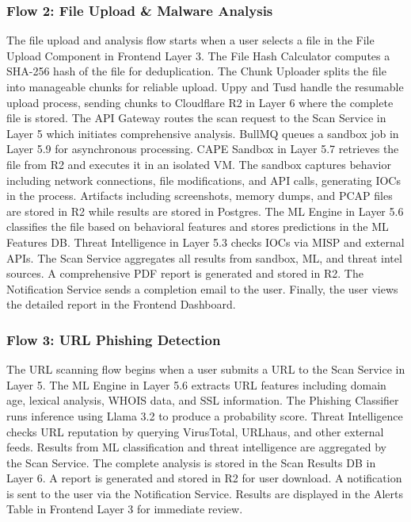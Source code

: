 \documentclass[12pt,a4paper]{report}
\begin{document}
\subsubsection{Flow 2: File Upload \& Malware Analysis}

The file upload and analysis flow starts when a user selects a file in the File Upload Component in Frontend Layer 3. The File Hash Calculator computes a SHA-256 hash of the file for deduplication. The Chunk Uploader splits the file into manageable chunks for reliable upload. Uppy and Tusd handle the resumable upload process, sending chunks to Cloudflare R2 in Layer 6 where the complete file is stored. The API Gateway routes the scan request to the Scan Service in Layer 5 which initiates comprehensive analysis. BullMQ queues a sandbox job in Layer 5.9 for asynchronous processing. CAPE Sandbox in Layer 5.7 retrieves the file from R2 and executes it in an isolated VM. The sandbox captures behavior including network connections, file modifications, and API calls, generating IOCs in the process. Artifacts including screenshots, memory dumps, and PCAP files are stored in R2 while results are stored in Postgres. The ML Engine in Layer 5.6 classifies the file based on behavioral features and stores predictions in the ML Features DB. Threat Intelligence in Layer 5.3 checks IOCs via MISP and external APIs. The Scan Service aggregates all results from sandbox, ML, and threat intel sources. A comprehensive PDF report is generated and stored in R2. The Notification Service sends a completion email to the user. Finally, the user views the detailed report in the Frontend Dashboard.

\subsubsection{Flow 3: URL Phishing Detection}

The URL scanning flow begins when a user submits a URL to the Scan Service in Layer 5. The ML Engine in Layer 5.6 extracts URL features including domain age, lexical analysis, WHOIS data, and SSL information. The Phishing Classifier runs inference using Llama 3.2 to produce a probability score. Threat Intelligence checks URL reputation by querying VirusTotal, URLhaus, and other external feeds. Results from ML classification and threat intelligence are aggregated by the Scan Service. The complete analysis is stored in the Scan Results DB in Layer 6. A report is generated and stored in R2 for user download. A notification is sent to the user via the Notification Service. Results are displayed in the Alerts Table in Frontend Layer 3 for immediate review.
\end{document}
